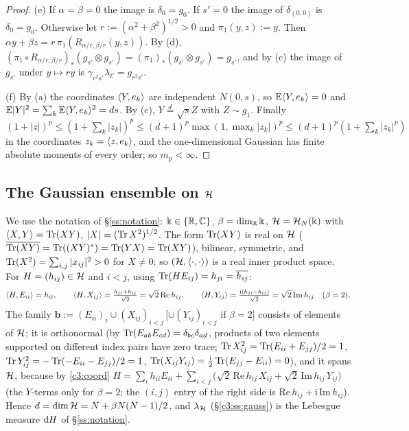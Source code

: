 \begin{proof}
(e) If $\alpha=\beta=0$ the image is $\delta_0=g_0$. If $s'=0$ the image of $\delta_{(0,0)}$ is $\delta_0=g_0$. Otherwise let $r:=(\alpha^2+\beta^2)^{1/2}>0$ and $\pi_1(y,z):=y$. Then $\alpha y+\beta z=r\,\pi_1(R_{\alpha/r,\beta/r}(y,z))$. By (d), $(\pi_1\circ R_{\alpha/r,\beta/r})_*(g_{s'}\otimes g_{s'})=(\pi_1)_*(g_{s'}\otimes g_{s'})=g_{s'}$, and by (c) the image of $g_{s'}$ under $y\mapsto ry$ is $\gamma_{r^2s'}\lambda_{\mathcal E}=g_{r^2s'}$.

(f) By (a) the coordinates $\langle Y,e_k\rangle$ are independent $N(0,s)$, so $\mathbb{E}\langle Y,e_k\rangle=0$ and $\mathbb{E}|Y|^2=\sum_k\mathbb{E}\langle Y,e_k\rangle^2=ds$. By (c), $Y\overset d=\sqrt sZ$ with $Z\sim g_1$. Finally $(1+|z|)^p\le(1+\sum_k|z_k|)^p\le(d+1)^{p}\max(1,\max_k|z_k|)^p\le(d+1)^p(1+\sum_k|z_k|^p)$ in the coordinates $z_k=\langle z,e_k\rangle$, and the one-dimensional Gaussian has finite absolute moments of every order; so $m_p<\infty$.
\end{proof}

\subsection{The Gaussian ensemble on $\mathcal{H}$}\label{c3:ss:GE}

We use the notation of \S\ref{ss:notation}: $\Bbbk\in\{\mathbb{R},\mathbb{C}\}$, $\beta=\dim_{\mathbb{R}}\Bbbk$, $\mathcal{H}=\mathcal{H}_N(\Bbbk)$ with $\langle X,Y\rangle=\operatorname{Tr}(XY)$, $|X|=(\operatorname{Tr} X^2)^{1/2}$.
The form $\operatorname{Tr}(XY)$ is real on $\mathcal{H}$ ($\overline{\operatorname{Tr}(XY)}=\operatorname{Tr}((XY)^*)=\operatorname{Tr}(YX)=\operatorname{Tr}(XY)$), bilinear, symmetric, and $\operatorname{Tr}(X^2)=\sum_{i,j}|x_{ij}|^2>0$ for $X\ne0$; so $(\mathcal{H},\langle\cdot,\cdot\rangle)$ is a real inner product space.
For $H=(h_{ij})\in\mathcal{H}$ and $i<j$, using $\operatorname{Tr}(HE_{ij})=h_{ji}=\overline{h_{ij}}$:
\begin{equation}\label{c3:coord}
\langle H,E_{ii}\rangle=h_{ii},\qquad \langle H,X_{ij}\rangle=\tfrac{h_{ji}+h_{ij}}{\sqrt2}=\sqrt2\,\mathrm{Re}\,h_{ij},\qquad \langle H,Y_{ij}\rangle=\tfrac{\mathrm i(h_{ji}-h_{ij})}{\sqrt2}=\sqrt2\,\mathrm{Im}\,h_{ij}\quad(\beta=2).
\end{equation}
The family $\mathbf b:=(E_{ii})_{i}\cup(X_{ij})_{i<j}\,[\cup(Y_{ij})_{i<j}$ if $\beta=2]$ consists of elements of $\mathcal{H}$; it is orthonormal (by $\operatorname{Tr}(E_{ab}E_{cd})=\delta_{bc}\delta_{ad}$, products of two elements supported on different index pairs have zero trace; $\operatorname{Tr} X_{ij}^2=\operatorname{Tr}(E_{ii}+E_{jj})/2=1$, $\operatorname{Tr} Y_{ij}^2=-\operatorname{Tr}(-E_{ii}-E_{jj})/2=1$, $\operatorname{Tr}(X_{ij}Y_{ij})=\frac{\mathrm i}2\operatorname{Tr}(E_{jj}-E_{ii})=0$), and it spans $\mathcal{H}$, because by \eqref{c3:coord}
$H=\sum_ih_{ii}E_{ii}+\sum_{i<j}\big(\sqrt2\,\mathrm{Re}\,h_{ij}\,X_{ij}+\sqrt2\,\mathrm{Im}\,h_{ij}\,Y_{ij}\big)$ (the $Y$-terms only for $\beta=2$; the $(i,j)$ entry of the right side is $\mathrm{Re}\,h_{ij}+\mathrm i\,\mathrm{Im}\,h_{ij}$). Hence $d=\dim\mathcal{H}=N+\beta N(N-1)/2$, and $\lambda_{\mathcal{H}}$ (\S\ref{c3:ss:gauss}) is the Lebesgue measure $\mathrm{d} H$ of \S\ref{ss:notation}.


